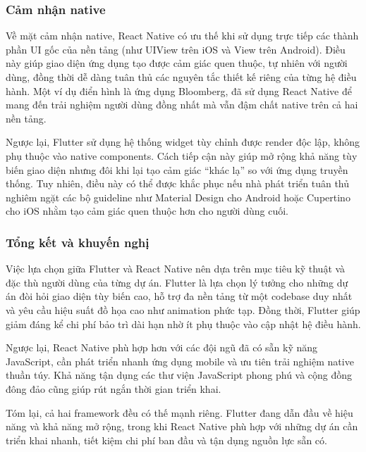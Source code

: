 \subsubsection{Cảm nhận native}


    \hspace*{0.8cm}Về mặt cảm nhận native, React Native có ưu thế khi sử dụng trực tiếp các thành phần UI gốc của nền tảng (như UIView trên iOS và View trên Android). Điều này giúp giao diện ứng dụng tạo được cảm giác quen thuộc, tự nhiên với người dùng, đồng thời dễ dàng tuân thủ các nguyên tắc thiết kế riêng của từng hệ điều hành. Một ví dụ điển hình là ứng dụng Bloomberg, đã sử dụng React Native để mang đến trải nghiệm người dùng đồng nhất mà vẫn đậm chất native trên cả hai nền tảng.

    \vspace{0.5em}

    \hspace*{1.5em}Ngược lại, Flutter sử dụng hệ thống widget tùy chỉnh được render độc lập, không phụ thuộc vào native components. Cách tiếp cận này giúp mở rộng khả năng tùy biến giao diện nhưng đôi khi lại tạo cảm giác “khác lạ” so với ứng dụng truyền thống. Tuy nhiên, điều này có thể được khắc phục nếu nhà phát triển tuân thủ nghiêm ngặt các bộ guideline như Material Design cho Android hoặc Cupertino cho iOS nhằm tạo cảm giác quen thuộc hơn cho người dùng cuối.
\vspace{0.5em}

\subsubsection{Tổng kết và khuyến nghị}


    \hspace*{0.8cm}Việc lựa chọn giữa Flutter và React Native nên dựa trên mục tiêu kỹ thuật và đặc thù người dùng của từng dự án. Flutter là lựa chọn lý tưởng cho những dự án đòi hỏi giao diện tùy biến cao, hỗ trợ đa nền tảng từ một codebase duy nhất và yêu cầu hiệu suất đồ họa cao như animation phức tạp. Đồng thời, Flutter giúp giảm đáng kể chi phí bảo trì dài hạn nhờ ít phụ thuộc vào cập nhật hệ điều hành.

    \vspace{0.5em}

    \hspace*{1.5em}Ngược lại, React Native phù hợp hơn với các đội ngũ đã có sẵn kỹ năng JavaScript, cần phát triển nhanh ứng dụng mobile và ưu tiên trải nghiệm native thuần túy. Khả năng tận dụng các thư viện JavaScript phong phú và cộng đồng đông đảo cũng giúp rút ngắn thời gian triển khai.

    \vspace{0.5em}

    \hspace*{1.5em}Tóm lại, cả hai framework đều có thế mạnh riêng. Flutter đang dẫn đầu về hiệu năng và khả năng mở rộng, trong khi React Native phù hợp với những dự án cần triển khai nhanh, tiết kiệm chi phí ban đầu và tận dụng nguồn lực sẵn có.
\vspace{0.5em}